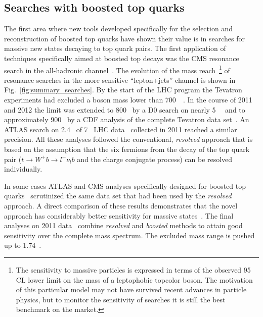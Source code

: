 \subsection{Searches with boosted top quarks}





The first area where new tools developed specifically for the selection and 
reconstruction of boosted top quarks have shown their value is in searches for 
massive new states decaying to top quark pairs. The first application 
of techniques specifically aimed at boosted top decays was the CMS 
\ttbar{} resonance search in the all-hadronic channel~\cite{Chatrchyan:2012ku}.
The evolution of the 
mass reach~\footnote{The sensitivity to massive particles is expressed in terms
of the observed 95 CL lower limit on the mass of a leptophobic topcolor \Zprime{} 
boson. The motivation of this particular model may not have survived recent 
advances in particle physics, but to monitor the sensitivity
of searches it is still the best benchmark on the market.} 
of \ttbar{} resonance searches in the more sensitive 
``lepton+jets'' channel is shown in 
Fig.~\ref{fig:summary_searches}. 
By the start of the LHC program the Tevatron experiments had excluded a \Zprime{} boson
mass lower than 700~\gev{}~\cite{Aaltonen:2007ag,Abazov:2008ny}. In the course of 2011 and 2012 
the limit was extended to 800~\gev{} by a D0 search on nearly 5~\ifb{}~\cite{Abazov:2011gv} 
and to approximately 900~\gev{} by a CDF analysis of
the complete Tevatron data set~\cite{Aaltonen:2012af}.
An ATLAS search on 2.4~\ifb{} of 7~\tev{} LHC data~\cite{Aad:2012wm} collected 
in 2011 reached a
similar precision. All these analyses followed the conventional, {\it resolved}
approach that is based on the assumption that the six fermions from the decay of
the top quark pair
($t \rightarrow W^+ b \rightarrow l^+ \nu_l b$ and the charge conjugate process)
can be resolved individually.


In some cases ATLAS and CMS analyses specifically designed for boosted top quarks~\cite{Aad:2012dpa,Chatrchyan:2012cx} scrutinized the same data set that had been used by the {\it resolved} approach.
A direct comparison of these results demonstrates that the novel approach has considerably better sensitivity for massive 
states~\cite{Aad:2012dpa}. The final analyses on 2011 data~\cite{Aad:2013nca,Chatrchyan:2012cx} combine {\it resolved}
and {\it boosted} methods to attain good 
sensitivity over the complete mass spectrum. The excluded mass range is pushed 
up to 1.74~\tev{}.

